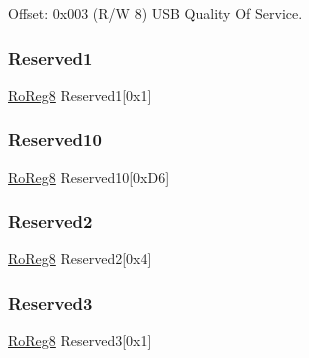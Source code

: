 Offset\+: 0x003 (R/W 8) U\+SB Quality Of Service. 

\mbox{\label{struct_usb_host_a092866123ac46d0985136e4dca2f36f4}} 
\subsubsection{\texorpdfstring{Reserved1}{Reserved1}}
{\footnotesize\ttfamily \mbox{\hyperlink{group___s_a_m_d21_e15_a__definitions_ga0d957f1433aaf5d70e4dc2b68288442d}{Ro\+Reg8}} Reserved1\mbox{[}0x1\mbox{]}}

\mbox{\label{struct_usb_host_ac615b366d825327aa7079ef09c4b51ad}} 
\subsubsection{\texorpdfstring{Reserved10}{Reserved10}}
{\footnotesize\ttfamily \mbox{\hyperlink{group___s_a_m_d21_e15_a__definitions_ga0d957f1433aaf5d70e4dc2b68288442d}{Ro\+Reg8}} Reserved10\mbox{[}0x\+D6\mbox{]}}

\mbox{\label{struct_usb_host_a78f3c89e13bd565a077e9418f43aaa04}} 
\subsubsection{\texorpdfstring{Reserved2}{Reserved2}}
{\footnotesize\ttfamily \mbox{\hyperlink{group___s_a_m_d21_e15_a__definitions_ga0d957f1433aaf5d70e4dc2b68288442d}{Ro\+Reg8}} Reserved2\mbox{[}0x4\mbox{]}}

\mbox{\label{struct_usb_host_ae12c3e940f27988a085afebe2f779a21}} 
\subsubsection{\texorpdfstring{Reserved3}{Reserved3}}
{\footnotesize\ttfamily \mbox{\hyperlink{group___s_a_m_d21_e15_a__definitions_ga0d957f1433aaf5d70e4dc2b68288442d}{Ro\+Reg8}} Reserved3\mbox{[}0x1\mbox{]}}

